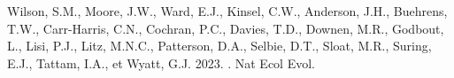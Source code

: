 \documentclass[french,11pt]{book}
\begin{document}
\begin{CSLReferences}{1}{0}
%
Wilson, S.M., Moore, J.W., Ward, E.J., Kinsel, C.W., Anderson, J.H., Buehrens, T.W., Carr-Harris, C.N., Cochran, P.C., Davies, T.D., Downen, M.R., Godbout, L., Lisi, P.J., Litz, M.N.C., Patterson, D.A., Selbie, D.T., Sloat, M.R., Suring, E.J., Tattam, I.A., et Wyatt, G.J. 2023. . Nat Ecol Evol.

\end{CSLReferences}
\end{document}
